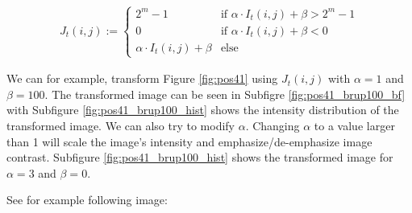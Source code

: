 \documentclass[pdftex,12pt,a4paper]{report}
\begin{document}
\begin{gather*}
J_t(i, j) :=
\begin{cases}
  2^m - 1 & \text{if } \alpha \cdot I_t(i, j) + \beta > 2^m - 1\\
  0 & \text{if } \alpha \cdot I_t(i, j) + \beta < 0\\
  \alpha \cdot I_t(i, j) + \beta & \text{else}
\end{cases}
\end{gather*}

We can for example, transform Figure \ref{fig:pos41} using $J_t(i, j)$ with $\alpha = 1$ and $\beta=100$. The transformed image can be seen in Subfigre \ref{fig:pos41_brup100_bf} with Subfigure \ref{fig:pos41_brup100_hist} shows the intensity distribution of the transformed image. We can also try to modify $\alpha$. Changing $\alpha$ to a value larger than 1 will scale the image's intensity and emphasize/de-emphasize image contrast. Subfigure \ref{fig:pos41_brup100_hist} shows the transformed image for $\alpha = 3$ and $\beta  = 0$.

See for example following image:
\end{document}
